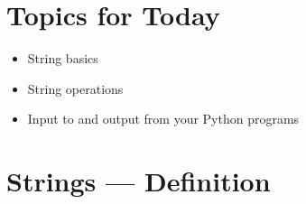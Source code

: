 \documentclass[letterpaper,10pt,english]{sphinxmanual}
\begin{document}
\section{Topics for Today}
\label{\detokenize{lecture_notes/lec03_strings:topics-for-today}}\begin{itemize}
\item {} 
String basics

\item {} 
String operations

\item {} 
Input to and output from your Python programs

\end{itemize}


\section{Strings — Definition}
\end{document}
